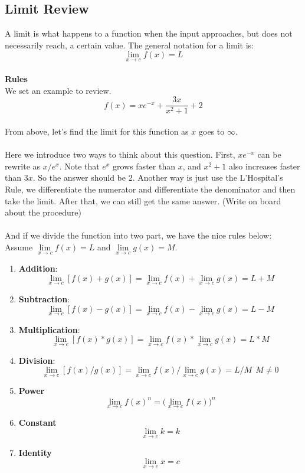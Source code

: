 \documentclass[a4paper,12pt]{article}
\let\cite\parencite
\begin{document}
\subsection{Limit Review}
A limit is what happens to a function when the input approaches, but does not necessarily reach, a certain value. The general notation for a limit is: $$\lim\limits_{x \rightarrow c} f(x) = L$$
\\
\textbf{Rules} \\
We set an example to review.
\begin{equation}
f(x) = xe^{-x} + \frac{3x}{x^2 + 1} + 2
\end{equation}
\\
From above, let's find the limit for this function as $x$ goes to $\infty$. \\
\\
Here we introduce two ways to think about this question. First, $xe^{-x}$ can be rewrite as $x/e^{x}$. Note that $e^{x}$ grows faster than $x$, and $x^2 + 1$ also increases faster than $3x$. So the answer should be 2. Another way is just use the L'Hospital's Rule, we differentiate the numerator and differentiate the denominator and then take the limit. After that, we can still get the same answer. (Write on board about the procedure)\\
\\
And if we divide the function into two part, we have the nice rules below: \cite{cal}\\
Assume $\lim\limits_{x \rightarrow c} f(x) = L$ and $\lim\limits_{x \rightarrow c} g(x) = M$.
\begin{enumerate}
\item \textbf{Addition}: 
 $$\lim\limits_{x \rightarrow c} [f(x) + g(x)] = \lim\limits_{x \rightarrow c} f(x) + \lim\limits_{x \rightarrow c} g(x) = L + M$$
\item \textbf{Subtraction}: 
 $$\lim\limits_{x \rightarrow c} [f(x) - g(x)]= \lim\limits_{x \rightarrow c} f(x) - \lim\limits_{x \rightarrow c} g(x) = L - M$$
\item \textbf{Multiplication}: 
 $$\lim\limits_{x \rightarrow c} [f(x) * g(x)] = \lim\limits_{x \rightarrow c} f(x) * \lim\limits_{x \rightarrow c} g(x) = L * M$$
\item \textbf{Division}: 
 $$\lim\limits_{x \rightarrow c} [f(x) / g(x)] = \lim\limits_{x \rightarrow c} f(x) / \lim\limits_{x \rightarrow c} g(x) = L / M \ \ M \neq 0$$
  \item \textbf{Power}
$$\lim\limits_{x \rightarrow c} f(x)^n = \Big(\lim\limits_{x \rightarrow c} f(x)\Big)^n$$
 \item \textbf{Constant}
$$\lim\limits_{x \rightarrow c} k = k$$
 \item \textbf{Identity}
$$\lim\limits_{x \rightarrow c} x = c$$
\end{enumerate}
\end{document}

